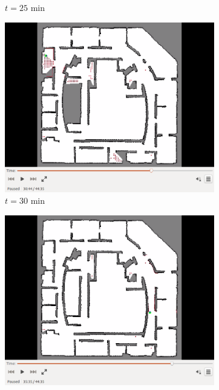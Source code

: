 \documentclass[11pt,professionalfonts,hyperref={pdftex,pdfpagemode=none,pdfstartview=FitH}]{beamer}
\begin{document}
\begin{frame}
\begin{figure}[!ht]
\begin{subfigure}[t]{0.2\columnwidth}
        \caption*{$t=25$ min}
        \label{fig:IRL25min}
    \end{subfigure}
    \begin{subfigure}[t]{0.2\columnwidth}
           \centering
           \includegraphics[trim = {4.6cm 3.8cm 4.6cm 0}, clip, width=\textwidth]{30min.png}
        \caption*{$t=30$ min}
        \label{fig:IRL30min}
    \end{subfigure}
    \begin{subfigure}[t]{0.2\columnwidth}
           \centering
           \includegraphics[trim = {4.6cm 3.8cm 4.6cm 0}, clip, width=\textwidth]{35min.png}

\end{subfigure}
\end{figure}
\end{frame}
\end{document}
